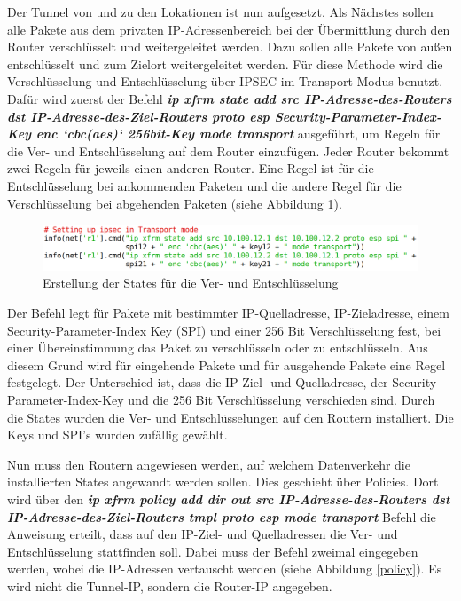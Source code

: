 \documentclass[fontsize=12pt,paper=a4,open=any,parskip=half,
  twoside=false,toc=listof,toc=bibliography,fleqn,leqno,
  captions=nooneline,captions=tableabove,british]{scrbook}
\begin{document}
Der Tunnel von und zu den Lokationen ist nun aufgesetzt. Als Nächstes sollen alle Pakete aus dem privaten IP-Adressenbereich bei der Übermittlung durch den Router verschlüsselt und weitergeleitet werden. Dazu sollen alle Pakete von außen entschlüsselt und zum Zielort weitergeleitet werden. Für diese Methode wird die Verschlüsselung und Entschlüsselung über IPSEC im Transport-Modus benutzt. Dafür wird zuerst der Befehl \textit{\textbf{ip xfrm state add src IP-Adresse-des-Routers dst IP-Adresse-des-Ziel-Routers proto esp Security-Parameter-Index-Key enc ‘cbc(aes)‘ 256bit-Key mode transport}} ausgeführt, um Regeln für die Ver- und Entschlüsselung auf dem Router einzufügen. Jeder Router bekommt zwei Regeln für jeweils einen anderen Router. Eine Regel ist für die Entschlüsselung bei ankommenden Paketen und die andere Regel für die Verschlüsselung bei abgehenden Paketen (siehe Abbildung \ref{state}).

\begin{figure}[H]
 \centering
 \includegraphics[width=1.0\textwidth]{Bilder/state}
 \captionsetup{justification=centering,margin=2cm}
 \caption{Erstellung der States für die Ver- und Entschlüsselung}
 \label{state}
\end{figure}

Der Befehl legt für Pakete mit bestimmter IP-Quelladresse, IP-Zieladresse, einem Security-Parameter-Index Key (SPI) und einer 256 Bit Verschlüsselung fest, bei einer Übereinstimmung das Paket zu verschlüsseln oder zu entschlüsseln. Aus diesem Grund wird für eingehende Pakete und für ausgehende Pakete eine Regel festgelegt. Der Unterschied ist, dass die IP-Ziel- und Quelladresse, der Security-Parameter-Index-Key und die 256 Bit Verschlüsselung verschieden sind. Durch die States wurden die Ver- und Entschlüsselungen auf den Routern installiert. Die Keys und SPI’s wurden zufällig gewählt.

Nun muss den Routern angewiesen werden, auf welchem Datenverkehr die installierten States angewandt werden sollen. Dies geschieht über Policies. Dort wird über den \textit{\textbf{ip xfrm policy add dir out src IP-Adresse-des-Routers dst IP-Adresse-des-Ziel-Routers tmpl proto esp mode transport}} Befehl die Anweisung erteilt, dass auf den IP-Ziel- und Quelladressen die Ver- und Entschlüsselung stattfinden soll. Dabei muss der Befehl zweimal eingegeben werden, wobei die IP-Adressen vertauscht werden (siehe Abbildung \ref{policy}). Es wird nicht die Tunnel-IP, sondern die Router-IP angegeben.
\end{document}
